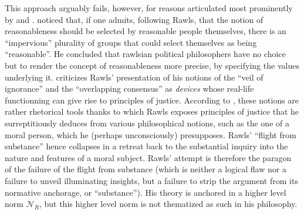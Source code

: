 \documentclass[preprint, french, english, 11pt, authoryear]{elsarticle}%
\begin{document}
This approach arguably fails, however, for reasons articulated most prominently by \cite{habermas_reconciliation_1995} and \cite{estlund_democratic_2009}. \citet{estlund_democratic_2009} noticed that, if one admits, following Rawls, that the notion of reasonableness should be selected by reasonable people themselves, there is an “impervious” plurality of groups that could select themselves as being “reasonable”. He concluded that rawlsian political philosophers have no choice but to render the concept of reasonableness more precise, by specifying the values underlying it. \cite{habermas_reconciliation_1995} criticizes Rawls' presentation of his notions of the “veil of ignorance” and the “overlapping consensus” as \emph{devices} whose real-life functionning can give rise to principles of justice. According to \cite{habermas_reconciliation_1995}, these notions are rather rhetorical tools thanks to which Rawls exposes principles of justice that he surreptitiously deduces from various philosophical notions, such as the one of a moral person, which he (perhaps unconsciously) presupposes. Rawls' ``flight from substance'' hence collapses in a retreat back to the substantial inquiry into the nature and features of a moral subject.  Rawls' attempt is therefore the paragon of the failure of the flight from substance (which is neither a logical flaw nor a failure to unveil illuminating insights, but a failure to strip the argument from its normative anchorage, or “substance”). His theory is anchored in a higher level norm $\mathscr{N}_R$, but this higher level norm is not thematized as such in his philosophy.
\end{document}
